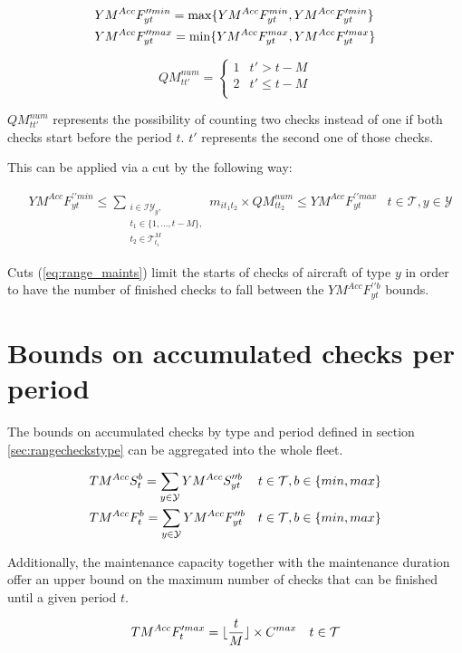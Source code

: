\documentclass[a4paper,onecolumn,fleqn]{article}
\begin{document}
  \begin{align}
    & YM^{Acc}F^{\prime\prime min}_{yt} = \max\{YM^{Acc}F^{min}_{yt}, YM^{Acc}F^{\prime min}_{yt}\}\notag\\ 
    & YM^{Acc}F^{\prime\prime max}_{yt} = \min\{YM^{Acc}F^{max}_{yt}, YM^{Acc}F^{\prime max}_{yt}\}\notag
  \end{align}

  \[
    QM^{num}_{tt'} = 
    \begin{cases} 
     1 & t' > t - M \\
     2 & t' \le t - M \\
    \end{cases} 
  \]

  $QM^{num}_{tt'}$ represents the possibility of counting two checks instead of one if both checks start before the period $t$. $t'$ represents the second one of those checks. 

  This can be applied via a cut by the following way:

  \begin{align}
    & YM^{Acc}F^{\prime\prime min}_{yt} \le \sum_{\substack{i \in \mathcal{IY}_y, \\ t_1 \in \{1, \ldots, t - M\}, \\ t_2 \in \mathcal{T}^M_{t_1}}} m_{it_1t_2} \times QM^{num}_{tt_2} \le YM^{Acc}F^{\prime\prime max}_{yt}
        & t \in \mathcal{T}, y \in \mathcal{Y} \label{eq:range_maints}
  \end{align}

  Cuts (\ref{eq:range_maints}) limit the starts of checks of aircraft of type $y$ in order to have the number of finished checks to fall between the $YM^{Acc}F^{\prime\prime b}_{yt}$ bounds.

\section{Bounds on accumulated checks per period}
  
  The bounds on accumulated checks by type and period defined in section \ref{sec:rangecheckstype} can be aggregated into the whole fleet.

  \begin{align}
    & TM^{Acc}S^{b}_{t} = \sum_{y \in \mathcal{Y}} YM^{Acc}S^{\prime\prime b}_{yt}
        & t \in \mathcal{T}, b \in \{min, max\}  \notag\\
    & TM^{Acc}F^{b}_{t} = \sum_{y \in \mathcal{Y}} YM^{Acc}F^{\prime\prime b}_{yt}
        & t \in \mathcal{T}, b \in \{min, max\}  \notag
  \end{align}

  Additionally, the maintenance capacity together with the maintenance duration offer an upper bound on the maximum number of checks that can be finished until a given period $t$.

  \begin{align}
    & TM^{Acc}F^{\prime max}_{t} = \lfloor \frac{t}{M} \rfloor \times C^{max}
        & t \in \mathcal{T} \notag
  \end{align}
\end{document}
